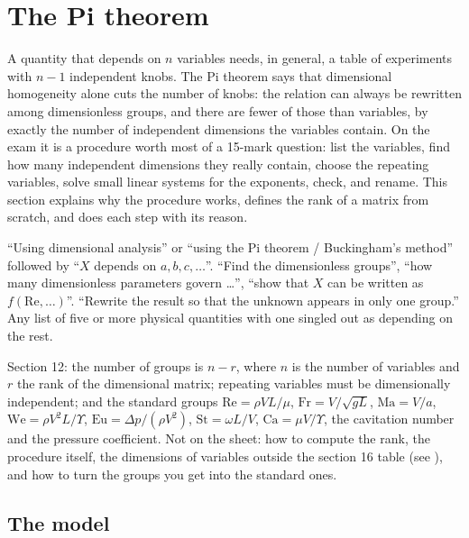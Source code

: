 \section{The Pi theorem}
\label{sec:pitheorem}

A quantity that depends on $n$ variables needs, in general, a table of experiments with $n - 1$ independent knobs. The Pi theorem says that dimensional homogeneity alone cuts the number of knobs: the relation can always be rewritten among dimensionless groups, and there are fewer of those than variables, by exactly the number of independent dimensions the variables contain. On the exam it is a procedure worth most of a 15-mark question: list the variables, find how many independent dimensions they really contain, choose the repeating variables, solve small linear systems for the exponents, check, and rename. This section explains why the procedure works, defines the rank of a matrix from scratch, and does each step with its reason.

\begin{recognise}
``Using dimensional analysis'' or ``using the Pi theorem / Buckingham's method'' followed by ``$X$ depends on $a, b, c, \dots$''. ``Find the dimensionless groups'', ``how many dimensionless parameters govern \dots'', ``show that $X$ can be written as $f(\mathrm{Re}, \dots)$''. ``Rewrite the result so that the unknown appears in only one group.'' Any list of five or more physical quantities with one singled out as depending on the rest.
\end{recognise}

\begin{onsheet}
Section 12: the number of groups is $n - r$, where $n$ is the number of variables and $r$ the rank of the dimensional matrix; repeating variables must be dimensionally independent; and the standard groups $\mathrm{Re} = \rho VL/\mu$, $\mathrm{Fr} = V/\sqrt{gL}$, $\mathrm{Ma} = V/a$, $\mathrm{We} = \rho V^2 L/\Upsilon$, $\mathrm{Eu} = \Delta p/(\rho V^2)$, $\mathrm{St} = \omega L/V$, $\mathrm{Ca} = \mu V/\Upsilon$, the cavitation number and the pressure coefficient. Not on the sheet: how to compute the rank, the procedure itself, the dimensions of variables outside the section 16 table (see ), and how to turn the groups you get into the standard ones.
\end{onsheet}

\subsection*{The model}

